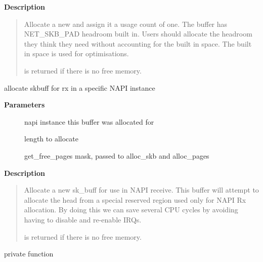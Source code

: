 \documentclass[a4paper,8pt,english]{sphinxmanual}
\begin{document}
\textbf{Description}
\begin{quote}

Allocate a new {\hyperref[networking/kapi:c.sk_buff]{\emph{}}} and assign it a usage count of one. The
buffer has NET\_SKB\_PAD headroom built in. Users should allocate
the headroom they think they need without accounting for the
built in space. The built in space is used for optimisations.

 is returned if there is no free memory.
\end{quote}

\begin{fulllineitems}
\label{networking/kapi:c.__napi_alloc_skb}
allocate skbuff for rx in a specific NAPI instance

\end{fulllineitems}


\textbf{Parameters}
\begin{description}
\item[{}] \leavevmode
napi instance this buffer was allocated for

\item[{}] \leavevmode
length to allocate

\item[{}] \leavevmode
get\_free\_pages mask, passed to alloc\_skb and alloc\_pages

\end{description}

\textbf{Description}
\begin{quote}

Allocate a new sk\_buff for use in NAPI receive.  This buffer will
attempt to allocate the head from a special reserved region used
only for NAPI Rx allocation.  By doing this we can save several
CPU cycles by avoiding having to disable and re-enable IRQs.

 is returned if there is no free memory.
\end{quote}

\begin{fulllineitems}
\label{networking/kapi:c.__kfree_skb}
private function

\end{fulllineitems}
\end{document}
